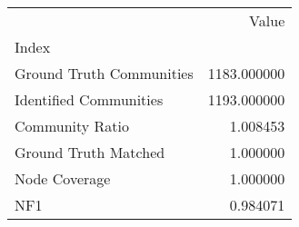 \begin{tabular}{lr}
\toprule
{} &        Value \\
Index                    &              \\
\midrule
Ground Truth Communities &  1183.000000 \\
Identified Communities   &  1193.000000 \\
Community Ratio          &     1.008453 \\
Ground Truth Matched     &     1.000000 \\
Node Coverage            &     1.000000 \\
NF1                      &     0.984071 \\
\bottomrule
\end{tabular}
